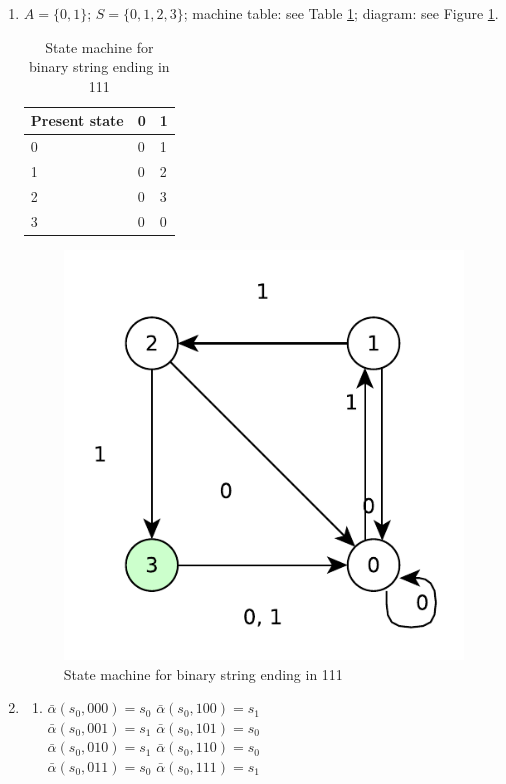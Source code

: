 \begin{enumerate}
    \item $A = \{0, 1\}$; $S = \{0, 1, 2, 3\}$; machine table: see Table \ref{tab:ends-in-111}; diagram: see Figure \ref{fig:ends-in-111}.
    \begin{table}[]
        \centering
        \begin{tabular}{l|ll}
        Present state & 0 & 1 \\ \hline
        0             & 0 & 1 \\
        1             & 0 & 2 \\
        2             & 0 & 3 \\
        3             & 0 & 0
        \end{tabular}
        \caption{State machine for binary string ending in 111}
        \label{tab:ends-in-111}
    \end{table}
    \begin{figure}[!ht]
        \centering
        \includegraphics[scale=0.5]{diagrams/ends-in-111.pdf}
        \caption{State machine for binary string ending in 111}
        \label{fig:ends-in-111}
    \end{figure}

    \item \begin{enumerate}[label=(\alph*)]
        \item 
        $\bar{\alpha}(s_0, 000) = s_0$\quad
        $\bar{\alpha}(s_0, 100) = s_1$\\
        $\bar{\alpha}(s_0, 001) = s_1$\quad
        $\bar{\alpha}(s_0, 101) = s_0$\\
        $\bar{\alpha}(s_0, 010) = s_1$\quad
        $\bar{\alpha}(s_0, 110) = s_0$\\
        $\bar{\alpha}(s_0, 011) = s_0$\quad
        $\bar{\alpha}(s_0, 111) = s_1$


\end{enumerate}
\end{enumerate}

